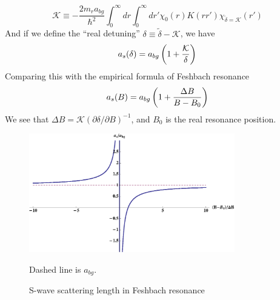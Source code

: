 \begin{equation}\label{eq:intro:kappa}
\mathcal{K}\equiv-\frac{2m_{r}a_{bg}}{\hbar^{2}}\int_{0}^{\infty}{dr}\int_{0}^{\infty}dr'\chi_{0}(r)K(rr')\chi_{\tilde\delta=\mathcal{K}}(r')
\end{equation}
And if we define the ``real detuning'' $\delta\equiv\tilde\delta-\mathcal{K}$, we have 
\begin{equation}
a_{s}(\delta)=a_{bg}\left(1+\frac{\mathcal{K}}{\delta}\right)
\end{equation}
Comparing this with the empirical formula of Feshbach resonance
\begin{equation}
a_{s}(B)=a_{bg}\left(1+\frac{\Delta{B}}{B-B_{0}}\right)
\end{equation}
We see that $\Delta{B}=\mathcal{K}(\partial\delta/\partial{B})^{-1}$, and $B_{0}$ is the real resonance position.  %
\begin{figure}[htbp]
\begin{center}
\includegraphics[width=0.8\textwidth]{FeshbachAs}
\caption{S-wave scattering length in Feshbach resonance} 
\label{fig:intro:Feshbach}
{\small Dashed line is $a_{bg}$.}
\end{center}
\end{figure}

